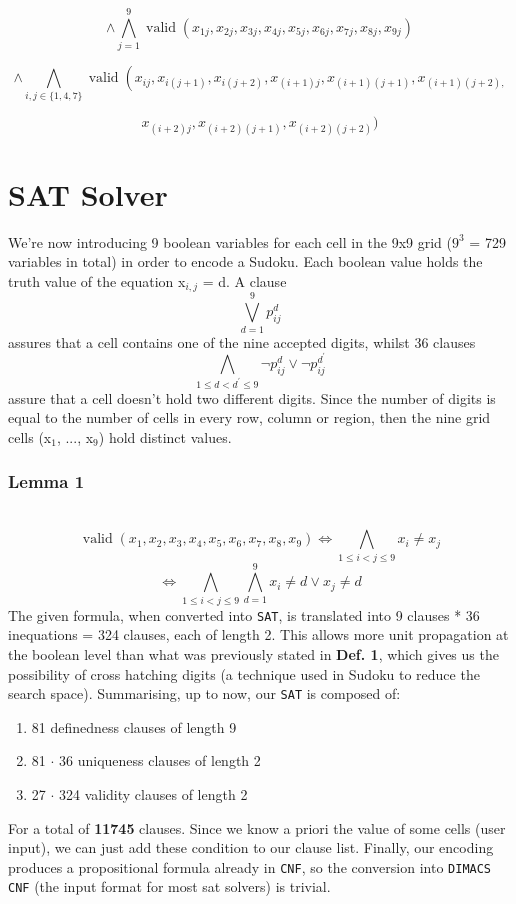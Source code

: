 \documentclass[paper=a4, fontsize=14pt]{scrartcl} %
\begin{document}
	\[ \wedge \bigwedge_{j=1}^{9} \operatorname{valid}\left(x_{1 j}, x_{2 j}, x_{3 j}, x_{4 j}, x_{5 j}, x_{6 j}, x_{7 j}, x_{8 j}, x_{9 j}\right)\]

	\[ \wedge \bigwedge_{i, j \in\{1,4,7\}} \operatorname{valid}\left(x_{i j}, x_{i(j+1)}, x_{i(j+2)}, x_{(i+1) j}, x_{(i+1)(j+1)}, x_{(i+1)(j+2),}\right.\]

	\[ x_{(i+2) j}, x_{(i+2)(j+1)}, x_{(i+2)(j+2)} )\]

	\section*{SAT Solver}
	We're now introducing 9 boolean variables for each cell in the 9x9 grid ($9^3$ = 729 variables in total) in order to encode a Sudoku.
	\newline
	Each boolean value holds the truth value of the equation x$_{i,j}$ = d.
	\newline A clause \[\bigvee_{d=1}^{9} p_{i j}^{d}\] assures that a cell contains one of the nine accepted digits, whilst 36 clauses
	\newline
	\[\bigwedge_{1 \leq d<d^{\prime} \leq 9} \neg p_{i j}^{d} \vee \neg p_{i j}^{d^{\prime}} \]
	assure that a cell doesn't hold two different digits.
	\newline
	Since the number of digits is equal to the number of cells in every row, column or region, then the nine grid cells (x$_1$, ..., x$_9$) hold distinct values.
	\newline
	\subsubsection*{Lemma 1} \\
	\[\operatorname{valid}\left(x_{1}, x_{2}, x_{3}, x_{4}, x_{5}, x_{6}, x_{7}, x_{8}, x_{9}\right) \Longleftrightarrow \bigwedge_{1 \leq i<j \leq 9} x_{i} \neq x_{j}\]
	\[\Longleftrightarrow \bigwedge_{1 \leq i<j \leq 9} \bigwedge_{d=1}^{9} x_{i} \neq d \vee x_{j} \neq d\]
	\newline
The given formula, when converted into \texttt{SAT}, is translated into 9 clauses * 36 inequations = 324 clauses, each of length 2. This allows more unit propagation at the boolean level than what was previously stated in \textbf{Def. 1}, which gives us the possibility of cross hatching digits (a technique used in Sudoku to reduce the search space).
\newline
Summarising, up to now, our \texttt{SAT} is composed of:
	\begin{enumerate}
		\item 81 definedness clauses of length 9
		\item 81 $\cdot$ 36 uniqueness clauses of length 2
		\item 27 $\cdot$ 324 validity clauses of length 2
	\end{enumerate}
For a total of \textbf{11745} clauses.
\newline
Since we know a priori the value of some cells (user input), we can just add these condition to our clause list.
\newline
Finally, our encoding produces a propositional formula already in \texttt{CNF}, so the conversion into \texttt{DIMACS CNF} (the input format for most sat solvers) is trivial.
\end{document}
